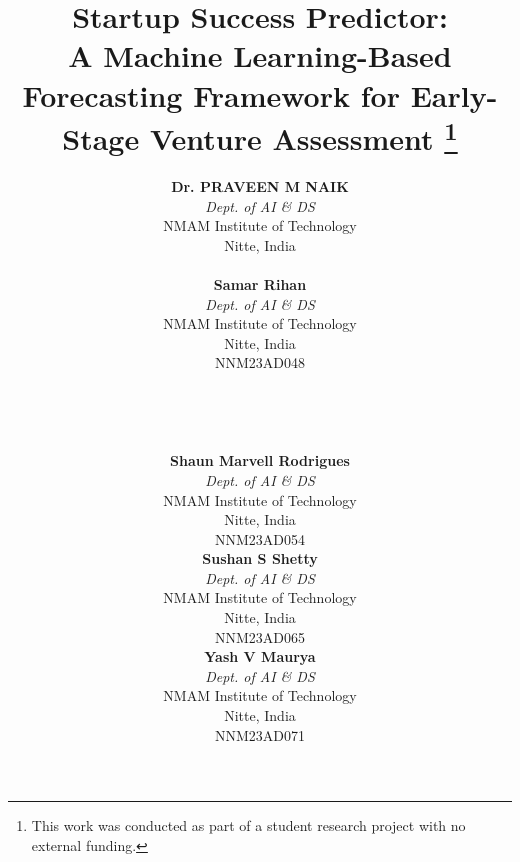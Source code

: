 \documentclass[conference]{IEEEtran}
\begin{document}
\title{Startup Success Predictor:\\
A Machine Learning-Based Forecasting Framework for Early-Stage Venture Assessment
\thanks{This work was conducted as part of a student research project with no external funding.}
}

\author{

\begin{minipage}{0.5\textwidth}
\centering
\textbf{Dr. PRAVEEN M NAIK}\\
\textit{Dept. of AI \& DS}\\
NMAM Institute of Technology\\
Nitte, India\\
[ Asst. Professor Gd.III]
\end{minipage}
\hfill
\begin{minipage}{0.5\textwidth}
\centering
\textbf{Samar Rihan}\\
\textit{Dept. of AI \& DS}\\
NMAM Institute of Technology\\
Nitte, India\\
NNM23AD048
\end{minipage}

\\[\baselineskip]  %
\\[\baselineskip]
\\[\baselineskip]

\begin{minipage}{0.3\textwidth}
\centering
\textbf{Shaun Marvell Rodrigues}\\
\textit{Dept. of AI \& DS}\\
NMAM Institute of Technology\\
Nitte, India\\
NNM23AD054
\end{minipage}

\hfill

\begin{minipage}{0.3\textwidth}
\centering
\textbf{Sushan S Shetty}\\
\textit{Dept. of AI \& DS}\\
NMAM Institute of Technology\\
Nitte, India\\
NNM23AD065
\end{minipage}


\begin{minipage}{0.3\textwidth}
\centering
\textbf{Yash V Maurya}\\
\textit{Dept. of AI \& DS}\\
NMAM Institute of Technology\\
Nitte, India\\
NNM23AD071
\end{minipage}

}
\end{document}
